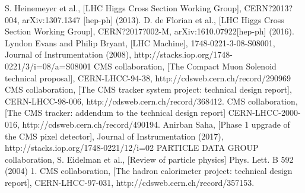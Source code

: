 \begin{thebibliography}{999}
		 S. Heinemeyer et al., [LHC Higgs Cross Section Working Group], CERN?2013?004, arXiv:1307.1347 [hep-ph] (2013).
		 D. de Florian et al., [LHC Higgs Cross Section Working Group], CERN?2017?002-M, arXiv:1610.07922[hep-ph] (2016).
		 Lyndon Evans and Philip Bryant, [LHC Machine], 1748-0221-3-08-S08001, Journal of Instrumentation (2008), http://stacks.iop.org/1748-0221/3/i=08/a=S08001
		 CMS collaboration, [The Compact Muon Solenoid technical proposal], CERN-LHCC-94-38, http://cdsweb.cern.ch/record/290969
		  CMS collaboration, [The CMS tracker system project: technical design report], CERN-LHCC-98-006, http://cdsweb.cern.ch/record/368412.
		  CMS collaboration, [The CMS tracker: addendum to the technical design report] CERN-LHCC-2000-016, http://cdsweb.cern.ch/record/490194.
		 Anirban Saha, [Phase 1 upgrade of the CMS pixel detector], Journal of Instrumentation (2017), http://stacks.iop.org/1748-0221/12/i=02
		 PARTICLE DATA GROUP collaboration, S. Eidelman et al., [Review of particle physics] Phys. Lett. B 592 (2004) 1.
		  CMS collaboration, [The hadron calorimeter project: technical design report], CERN-LHCC-97-031, http://cdsweb.cern.ch/record/357153.
				
           	  
	 
	 \end{thebibliography}
\clearpage{\pagestyle{empty}\cleardoublepage}